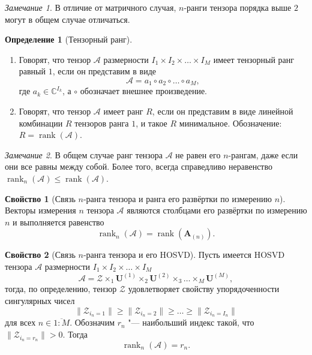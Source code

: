 \documentclass[specialist,
    substylefile = spbu_report.rtx,
    subf,href,colorlinks=true, 12pt]{disser}
\theoremstyle{plain}
\theoremstyle{definition}
\newtheorem{definition}{Определение}[section]
\newtheorem{property}{Свойство}[section]
\theoremstyle{remark}
\newtheorem*{remark}{Замечание}
\begin{document}
    \begin{remark}
        В отличие от матричного случая, $n$-ранги тензора порядка выше $2$ могут в общем случае отличаться.
    \end{remark}

    \begin{definition}[Тензорный ранг]
        \leavevmode
        \begin{enumerate}
            \item Говорят, что тензор $\mathcal{A}$ размерности $I_1\times I_2\times \ldots \times I_M$ имеет тензорный ранг равный $1$, если он представим в виде
            \[
                \mathcal{A}=a_1\circ a_2\circ \ldots \circ a_M,
            \]
            где $a_{k} \in \mathbb{C}^{I_k}$, а $\circ$ обозначает внешнее произведение.
            \item Говорят, что тензор $\mathcal{A}$ имеет ранг $R$, если он представим в виде линейной комбинации $R$ тензоров
            ранга $1$, и такое $R$ минимальное.
            Обозначение: $R=\operatorname{rank}(\mathcal{A})$.
        \end{enumerate}
    \end{definition}

    \begin{remark}
        В общем случае ранг тензора $\mathcal{A}$ не равен его $n$-рангам, даже если они все равны между собой.
        Более того, всегда справедливо неравенство $\operatorname{rank}_n(\mathcal{A})\leqslant \operatorname{rank}(\mathcal{A})$.
    \end{remark}

    \begin{property}
        [Связь $n$-ранга тензора и ранга его развёртки по измерению $n$]
        Векторы измерения $n$ тензора $\mathcal{A}$ являются столбцами его развёртки по измерению $n$ и выполняется равенство
        \[\operatorname{rank}_{n}(\mathcal{A})=\operatorname{rank}(\mathbf{A}_{(n)}).\]
    \end{property}

    \begin{property}
        [Связь $n$-ранга тензора и его HOSVD]\label{property:n-rank}
        Пусть имеется HOSVD тензора $\mathcal{A}$ размерности $I_1\times I_2\times \ldots \times I_M$
        \[\mathcal{A} = \mathcal{Z}\times_1 \mathbf{U}^{(1)}\times_2\mathbf{U}^{(2)}\times_3\ldots \times_{M}\mathbf{U}^{(M)},\]
        тогда, по определению, тензор $\mathcal{Z}$ удовлетворяет свойству упорядоченности сингулярных чисел
        \[\|\mathcal{Z}_{i_n=1}\|\geqslant\|\mathcal{Z}_{i_n=2}\|\geqslant\ldots \geqslant \|\mathcal{Z}_{i_n=I_n}\|\]
        для всех $n\in \overline{1:M}$.
        Обозначим $r_n$ "--- наибольший индекс такой, что $\|\mathcal{Z}_{i_n=r_n}\|>0$.
        Тогда
        \begin{equation}
            \operatorname{rank}_n(\mathcal{A})=r_n.\label{eq:n-rank}
        \end{equation}
    \end{property}
\end{document}
